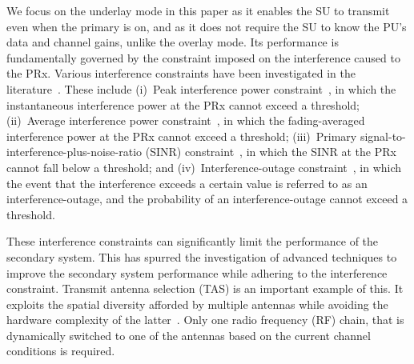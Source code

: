 \documentclass[12pt,draftcls,peerreview,onecolumn]{IEEEtran}
\begin{document}
We focus on the underlay mode in this paper as it enables the SU to transmit even when the primary is on, and as it does not require the SU to know the PU's data and channel gains, unlike the overlay mode. Its performance is fundamentally governed by the constraint imposed on the interference caused to the PRx. Various interference constraints have been investigated in the literature~\cite{Haykin_2005_TSAC}. These include (i)~Peak interference power constraint~\cite{ Hanif_2015_globecom,Wang_2010_TWC, RZhang_2009_TWC}, in which  the instantaneous interference power at the PRx cannot exceed  a threshold; (ii)~Average interference power  constraint~\cite{ Sarvendranath_2013_TCOM,Wang_2011_TCom, Kashyap_2014_TCOM }, in which  the fading-averaged interference power at the PRx  cannot exceed  a threshold; (iii)~Primary signal-to-interference-plus-noise-ratio (SINR) constraint~\cite{Dmochowski_2011_CROWNCOM}, in which the SINR at the PRx cannot fall below a threshold; and (iv)~Interference-outage constraint~\cite{hong_2008_icccas,Kashyap_2014_TCOM,Sboui_2013_TWC,Rezki_2012_ieeeVt}, in which the event that the interference exceeds a certain value is referred to as an interference-outage, and the probability of an interference-outage cannot exceed a threshold.  

These interference constraints can significantly limit the performance of the secondary system. This has spurred the investigation of advanced techniques to improve the secondary system performance while adhering to the interference constraint. Transmit antenna selection (TAS) is an important example of this. It exploits the spatial diversity afforded by multiple antennas while avoiding the hardware complexity of the latter~\cite{molisch_2004_MicrowaveMag,mehta_2012_ComMag}. Only one radio frequency (RF) chain, that is dynamically switched to one of the antennas based on the current channel conditions is required. 
\end{document}
